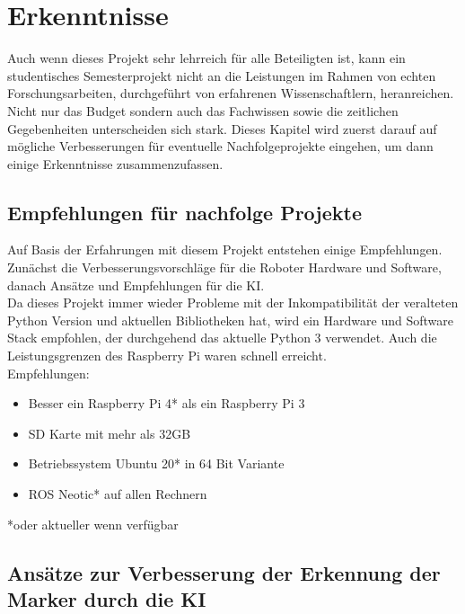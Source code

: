 \documentclass[conference]{IEEEtran}
\begin{document}
	\section{Erkenntnisse }
	Auch wenn dieses Projekt sehr lehrreich für alle Beteiligten ist, kann ein studentisches Semesterprojekt nicht an die Leistungen im Rahmen von echten Forschungsarbeiten, durchgeführt von erfahrenen Wissenschaftlern, heranreichen. Nicht nur das Budget sondern auch das Fachwissen sowie die zeitlichen Gegebenheiten unterscheiden sich stark. Dieses Kapitel wird zuerst darauf auf mögliche Verbesserungen für eventuelle Nachfolgeprojekte eingehen, um dann einige Erkenntnisse zusammenzufassen. 
	
	\subsection{Empfehlungen für nachfolge Projekte}
	
	 Auf Basis der Erfahrungen mit diesem Projekt entstehen einige 
	 Empfehlungen. Zunächst die Verbesserungsvorschläge für die Roboter 
	 Hardware und Software, danach Ansätze und Empfehlungen für die KI.\\
	Da dieses Projekt immer wieder Probleme mit der Inkompatibilität der veralteten Python Version und aktuellen Bibliotheken hat, wird ein Hardware und Software Stack empfohlen, der durchgehend das aktuelle Python 3 verwendet. Auch die Leistungsgrenzen des Raspberry Pi waren schnell erreicht. \\
	
	Empfehlungen:
	\begin{itemize}
		\item  Besser ein Raspberry Pi 4* als ein Raspberry Pi 3
		\item  SD Karte mit mehr als 32GB
		\item Betriebssystem Ubuntu 20* in 64 Bit Variante
		\item  ROS Neotic* auf allen Rechnern
	\end{itemize}
	*oder aktueller wenn verfügbar
	\subsection{Ansätze zur Verbesserung der Erkennung der Marker durch die KI}
	
\end{document}

